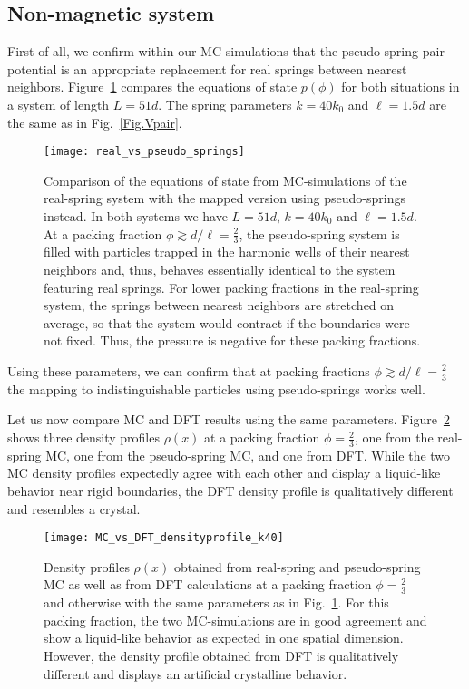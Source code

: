 \documentclass[aps,pre,twocolumn,superscriptaddress,nofootinbib]{revtex4}
\begin{document}
\subsection{Non-magnetic system}
First of all, we confirm within our MC-simulations that the pseudo-spring pair potential is an appropriate replacement for real springs between nearest neighbors. 
Figure~\ref{Fig.real_vs_pseudo_springs} compares the equations of state $p(\phi)$ for both situations in a system of length $L = 51 d$. 
The spring parameters $k = 40 k_0$ and $\ell = 1.5d$ are the same as in Fig.~\ref{Fig.Vpair}. 
%
\begin{figure}[b]
	\texttt{[image: real\_vs\_pseudo\_springs]}
	\caption{Comparison of the equations of state from MC-simulations of the real-spring system with the mapped version using pseudo-springs instead. In both systems we have $L = 51 d$, $k = 40 k_0$ and $\ell = 1.5d$. At a packing fraction $\phi \gtrsim d / \ell = \frac{2}{3}$, the pseudo-spring system is filled with particles trapped in the harmonic wells of their nearest neighbors and, thus, behaves essentially identical to the system featuring real springs. For lower packing fractions in the real-spring system, the springs between nearest neighbors are stretched on average, so that the system would contract if the boundaries were not fixed. Thus, the pressure is negative for these packing fractions.}
	\label{Fig.real_vs_pseudo_springs}
\end{figure}
% 
Using these parameters, we can confirm that at packing fractions $\phi \gtrsim d / \ell = \frac{2}{3}$ the mapping to indistinguishable particles using pseudo-springs works well.

Let us now compare MC and DFT results using the same parameters.
Figure~\ref{Fig.MC_vs_DFT_densityprofile_k40} shows three density profiles $\rho(x)$ at a packing fraction $\phi = \frac{2}{3}$, one from the real-spring MC, one from the pseudo-spring MC, and one from DFT.
While the two MC density profiles expectedly agree with each other and display a liquid-like behavior near rigid boundaries, the DFT density profile is qualitatively different and resembles a crystal.
%
\begin{figure}
	\texttt{[image: MC\_vs\_DFT\_densityprofile\_k40]}
	\caption{Density profiles $\rho(x)$ obtained from real-spring and pseudo-spring MC as well as from DFT calculations at a packing fraction $\phi = \frac{2}{3}$ and otherwise with the same parameters as in Fig.~\ref{Fig.real_vs_pseudo_springs}. For this packing fraction, the two MC-simulations are in good agreement and show a liquid-like behavior as expected in one spatial dimension. However, the density profile obtained from DFT is qualitatively different and displays an artificial crystalline behavior.}
	\label{Fig.MC_vs_DFT_densityprofile_k40}
\end{figure}
%
\end{document}
